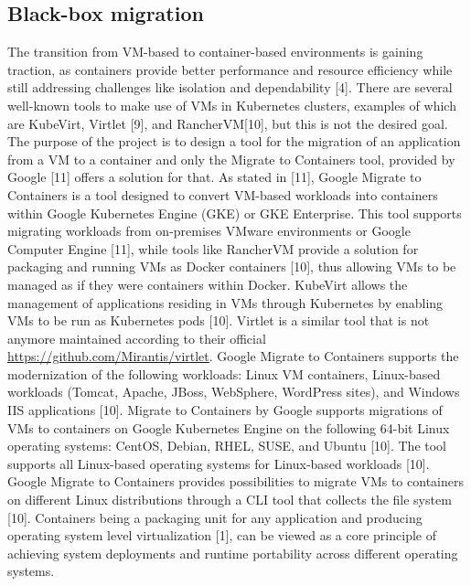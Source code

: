 \documentclass{article}
\begin{document}
\begin{multicols}{2}
\subsection{Black-box migration}
The transition from VM-based to container-based environments is gaining traction, as containers provide better performance and resource efficiency while still addressing challenges like isolation and dependability [4]. There are several well-known tools to make use of VMs in Kubernetes clusters, examples of which are KubeVirt, Virtlet [9], and RancherVM[10], but this is not the desired goal. The purpose of the project is to design a tool for the migration of an application from a VM to a container and only the Migrate to Containers tool, provided by Google [11] offers a solution for that. As stated in [11], Google Migrate to Containers is a tool designed to convert VM-based workloads into containers within Google Kubernetes Engine (GKE) or GKE Enterprise. This tool supports migrating workloads from on-premises VMware environments or Google Computer Engine [11], while tools like RancherVM provide a solution for packaging and running VMs as Docker containers [10], thus allowing VMs to be managed as if they were containers within Docker. KubeVirt allows the management of applications residing in VMs through Kubernetes by enabling VMs to be run as Kubernetes pods [10]. Virtlet is a similar tool that is not anymore maintained according to their official \href{Github repository}{https://github.com/Mirantis/virtlet}.
Google Migrate to Containers supports the modernization of the following workloads: Linux VM containers, Linux-based workloads (Tomcat, Apache, JBoss, WebSphere, WordPress sites), and Windows IIS applications [10]. Migrate to Containers by Google supports migrations of VMs to containers on Google Kubernetes Engine on the following 64-bit Linux operating systems: CentOS, Debian, RHEL, SUSE, and Ubuntu [10]. The tool supports all Linux-based operating systems for Linux-based workloads [10]. Google Migrate to Containers provides possibilities to migrate VMs to containers on different Linux distributions through a CLI tool that collects the file system [10]. Containers being a packaging unit for any application and producing operating system level virtualization [1], can be viewed as a core principle of achieving system deployments and runtime portability across different operating systems.

\end{multicols}
\end{document}
